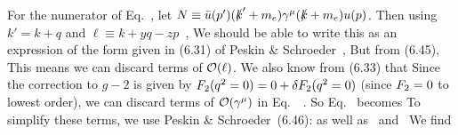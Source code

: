 \documentclass[11pt]{article}
\begin{document}
{	For the numerator of Eq.~, let $N \equiv \bar{u}(p') (\slashed{k}' + m_e) \gamma^\mu (\slashed{k} + m_e) u(p)$.  Then using $k' = k + q$ and $\ell \equiv k + y q - z p$~\cite[p.~191]{Peskin},
	We should be able to write this as an expression of the form given in (6.31) of Peskin \& Schroeder~\cite[p.~191]{Peskin},
	But from (6.45),
	This means we can discard terms of $\order{\ell}$.  We also know from (6.33) that
	Since the correction to $g - 2$ is given by $F_2(q^2 = 0) = 0 + \delta F_2(q^2 = 0)$ (since $F_2 = 0$ to lowest order), we can discard terms of $\order{\gamm}$ in Eq.~~\cite[pp.~186, 196]{Peskin}.  So Eq.~ becomes
	To simplify these terms, we use Peskin \& Schroeder~(6.46):
	as well as~\cite[pp.~191--192]{Peskin}
	and~\cite{Gamma, Feynman}
	We find
	}
\end{document}
